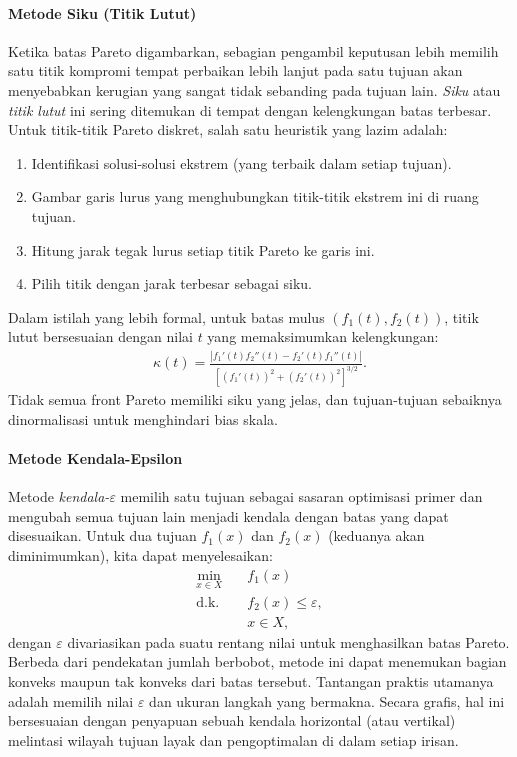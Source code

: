 \paragraph{Metode Siku (Titik Lutut)}
Ketika batas Pareto digambarkan, sebagian pengambil keputusan lebih memilih satu titik kompromi tempat perbaikan lebih lanjut pada satu tujuan akan menyebabkan kerugian yang sangat tidak sebanding pada tujuan lain. \emph{Siku} atau \emph{titik lutut} ini sering ditemukan di tempat dengan kelengkungan batas terbesar.
Untuk titik-titik Pareto diskret, salah satu heuristik yang lazim adalah:
\begin{enumerate}
    \item Identifikasi solusi-solusi ekstrem (yang terbaik dalam setiap tujuan).
    \item Gambar garis lurus yang menghubungkan titik-titik ekstrem ini di ruang tujuan.
    \item Hitung jarak tegak lurus setiap titik Pareto ke garis ini.
    \item Pilih titik dengan jarak terbesar sebagai siku.
\end{enumerate}
Dalam istilah yang lebih formal, untuk batas mulus $(f_1(t), f_2(t))$, titik lutut bersesuaian dengan nilai $t$ yang memaksimumkan kelengkungan:
\begin{align*}
\kappa(t) = \frac{|f_1'(t) f_2''(t) - f_2'(t) f_1''(t)|}{\left[ (f_1'(t))^2 + (f_2'(t))^2 \right]^{3/2}}.
\end{align*}
Tidak semua front Pareto memiliki siku yang jelas, dan tujuan-tujuan sebaiknya dinormalisasi untuk menghindari bias skala.
\paragraph{Metode Kendala-Epsilon}
Metode \emph{kendala-$\varepsilon$} memilih satu tujuan sebagai sasaran optimisasi primer dan mengubah semua tujuan lain menjadi kendala dengan batas yang dapat disesuaikan.
Untuk dua tujuan $f_1(x)$ dan $f_2(x)$ (keduanya akan diminimumkan), kita dapat menyelesaikan:
\begin{align*}
\min_{x \in X} \quad & f_1(x) \\
\text{d.k.} \quad & f_2(x) \le \varepsilon, \\
& x \in X,
\end{align*}
dengan $\varepsilon$ divariasikan pada suatu rentang nilai untuk menghasilkan batas Pareto. Berbeda dari pendekatan jumlah berbobot, metode ini dapat menemukan bagian konveks maupun tak konveks dari batas tersebut. Tantangan praktis utamanya adalah memilih nilai $\varepsilon$ dan ukuran langkah yang bermakna.
Secara grafis, hal ini bersesuaian dengan penyapuan sebuah kendala horizontal (atau vertikal) melintasi wilayah tujuan layak dan pengoptimalan di dalam setiap irisan.
